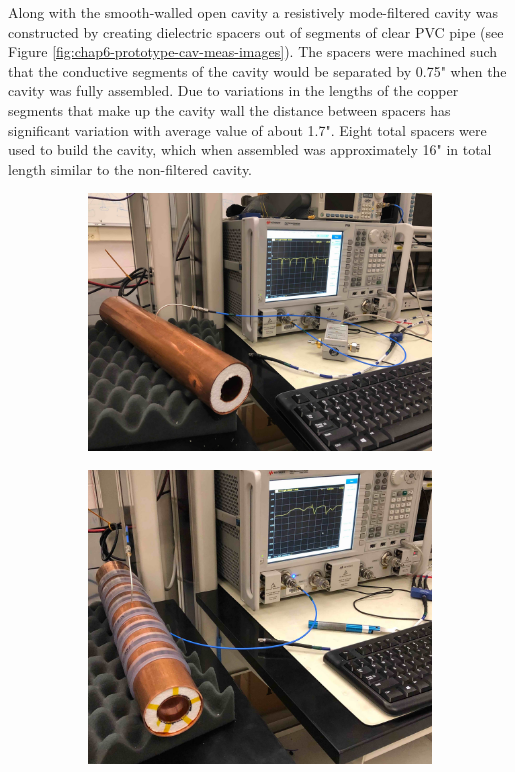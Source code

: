 Along with the smooth-walled open cavity a resistively mode-filtered cavity was constructed by creating dielectric spacers out of segments of clear PVC pipe (see Figure \ref{fig:chap6-prototype-cav-meas-images}). The spacers were machined such that the conductive segments of the cavity would be separated by 0.75" when the cavity was fully assembled. Due to variations in the lengths of the copper segments that make up the cavity wall the distance between spacers has significant variation with average value of about 1.7". Eight total spacers were used to build the cavity, which when assembled was approximately 16" in total length similar to the non-filtered cavity.
\begin{figure}[htbp]
    \centering
    \begin{subfigure}{0.48\textwidth}
        \includegraphics*[width=\textwidth]{figs/Chapter-6/230612_open_cav_meas_image.jpg}
        \caption{}        
    \end{subfigure}
    \hfill
    \begin{subfigure}{0.48\textwidth}
        \includegraphics*[width=\textwidth]{figs/Chapter-6/230612_filtered_cav_meas_image.jpg}

\end{subfigure}
\end{figure}
